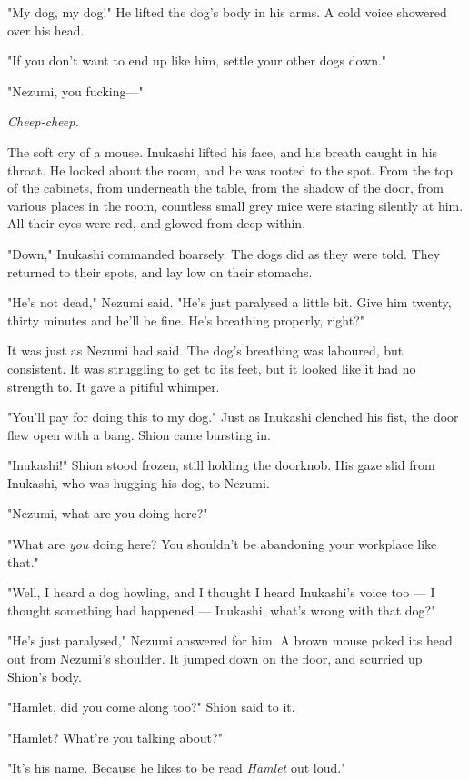 "My dog, my dog!" He lifted the dog's body in his arms. A cold voice
showered over his head.

"If you don't want to end up like him, settle your other dogs down."

"Nezumi, you fucking---"

\emph{Cheep-cheep.}

The soft cry of a mouse. Inukashi lifted his face, and his breath caught
in his throat. He looked about the room, and he was rooted to the spot.
From the top of the cabinets, from underneath the table, from the shadow
of the door, from various places in the room, countless small grey mice
were staring silently at him. All their eyes were red, and glowed from
deep within.

"Down," Inukashi commanded hoarsely. The dogs did as they were told.
They returned to their spots, and lay low on their stomachs.

"He's not dead," Nezumi said. "He's just paralysed a little bit. Give
him twenty, thirty minutes and he'll be fine. He's breathing properly,
right?"

It was just as Nezumi had said. The dog's breathing was laboured, but
consistent. It was struggling to get to its feet, but it looked like it
had no strength to. It gave a pitiful whimper.

"You'll pay for doing this to my dog." Just as Inukashi clenched his
fist, the door flew open with a bang. Shion came bursting in.

"Inukashi!" Shion stood frozen, still holding the doorknob. His gaze
slid from Inukashi, who was hugging his dog, to Nezumi.

"Nezumi, what are you doing here?"

"What are \emph{you} doing here? You shouldn't be abandoning your workplace
like that."

"Well, I heard a dog howling, and I thought I heard Inukashi's voice too
--- I thought something had happened --- Inukashi, what's wrong with that
dog?"

"He's just paralysed," Nezumi answered for him. A brown mouse poked its
head out from Nezumi's shoulder. It jumped down on the floor, and
scurried up Shion's body.

"Hamlet, did you come along too?" Shion said to it.

"Hamlet? What're you talking about?"

"It's his name. Because he likes to be read \emph{Hamlet} out loud."

